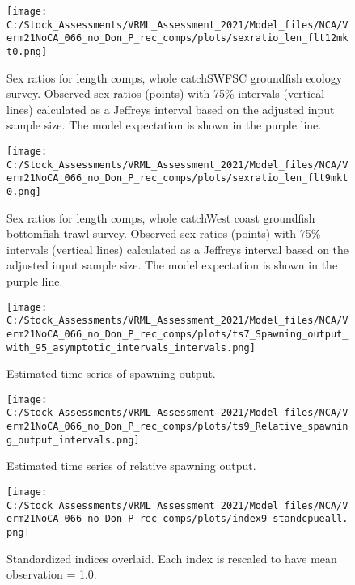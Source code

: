 \documentclass[11pt,
  english,
  a4paper,
]{article}
\begin{document}
\begin{figure}
\centering
\texttt{[image: C:/Stock\_Assessments/VRML\_Assessment\_2021/Model\_files/NCA/Verm21NoCA\_066\_no\_Don\_P\_rec\_comps/plots/sexratio\_len\_flt12mkt0.png]}
\caption{Sex ratios for length comps, whole catchSWFSC groundfish ecology survey. Observed sex ratios (points) with 75\% intervals (vertical lines) calculated as a Jeffreys interval based on the adjusted input sample size. The model expectation is shown in the purple line.\label{fig:sexratio-SWFSC-GF-ECOL}}
\end{figure}

\begin{figure}
\centering
\texttt{[image: C:/Stock\_Assessments/VRML\_Assessment\_2021/Model\_files/NCA/Verm21NoCA\_066\_no\_Don\_P\_rec\_comps/plots/sexratio\_len\_flt9mkt0.png]}
\caption{Sex ratios for length comps, whole catchWest coast groundfish bottomfish trawl survey. Observed sex ratios (points) with 75\% intervals (vertical lines) calculated as a Jeffreys interval based on the adjusted input sample size. The model expectation is shown in the purple line.\label{fig:sexratio-NWFSC-TWL}}
\end{figure}

\FloatBarrier

\begin{figure}
\centering
\texttt{[image: C:/Stock\_Assessments/VRML\_Assessment\_2021/Model\_files/NCA/Verm21NoCA\_066\_no\_Don\_P\_rec\_comps/plots/ts7\_Spawning\_output\_with\_95\_asymptotic\_intervals\_intervals.png]}
\caption{Estimated time series of spawning output.\label{fig:ssb}}
\end{figure}

\begin{figure}
\centering
\texttt{[image: C:/Stock\_Assessments/VRML\_Assessment\_2021/Model\_files/NCA/Verm21NoCA\_066\_no\_Don\_P\_rec\_comps/plots/ts9\_Relative\_spawning\_output\_intervals.png]}
\caption{Estimated time series of relative spawning output.\label{fig:depl}}
\end{figure}

\FloatBarrier

\begin{figure}
\centering
\texttt{[image: C:/Stock\_Assessments/VRML\_Assessment\_2021/Model\_files/NCA/Verm21NoCA\_066\_no\_Don\_P\_rec\_comps/plots/index9\_standcpueall.png]}
\caption{Standardized indices overlaid. Each index is rescaled to have mean observation = 1.0.\label{fig:cpueall}}
\end{figure}
\end{document}
